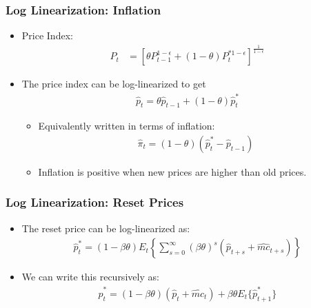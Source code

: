 \documentclass[english,xcolor=svgnames]{beamer}
\begin{document}
\begin{frame}
\frametitle{Log Linearization: Inflation
}
\begin{itemize}
	\item Price Index:
	\begin{align*}
		P_t&=\left[\theta P_{t-1}^{1-\epsilon} + (1-\theta) P_{t}^{*1-\epsilon}\right]^{\frac{1}{1-\epsilon}} 
	\end{align*}
	\item The price index can be log-linearized to get
	\begin{align*}
		\hat{p}_t=\theta \hat{p}_{t-1}+(1-\theta)\hat{p}_t^*
	\end{align*}
	\begin{itemize}
		\item Equivalently written in terms of inflation:
		\begin{align*}
		\hat{\pi}_t=(1-\theta)(\hat{p}_t^*-\hat{p}_{t-1})
	\end{align*}
	\item Inflation is positive when new prices are higher than old prices.
	\end{itemize}
\end{itemize}
\end{frame}


\begin{frame}
\frametitle{Log Linearization: Reset Prices
}
\begin{itemize}
	\item The reset price can be log-linearized as:
	\begin{align*}
		\hat{p}_t^*=(1-\beta\theta)E_t\left\{\sum_{s=0}^{\infty}(\beta\theta)^s\left(\hat{p}_{t+s}+\hat{mc}_{t+s}\right)\right\} 
	\end{align*}
	\item We can write this recursively as:
	\begin{align*}
		\hat{p}_t^*=(1-\beta\theta)(\hat{p}_{t}+\hat{mc}_{t})+\beta\theta E_t\{\hat{p}_{t+1}^*\}
	\end{align*}
\end{itemize}
\end{frame}
\end{document}
